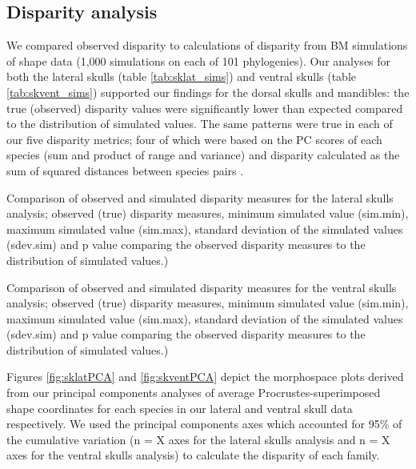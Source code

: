 \documentclass[12pt,a4paper]{article}
\begin{document}
\subsection{Disparity analysis}


We compared observed disparity to calculations of disparity from BM simulations of shape data (1,000 simulations on each of 101 phylogenies). Our analyses for both the lateral skulls (table \ref{tab:sklat_sims}) and ventral skulls (table \ref{tab:skvent_sims}) supported our findings for the dorsal skulls and mandibles: the true (observed) disparity values were significantly lower than expected compared to the distribution of simulated values. The same patterns were true in each of our five disparity metrics; four of which were based on the PC scores of each species (sum and product of range and variance) and disparity calculated as the sum of squared distances between species pairs \citep{Zelditch2012}. 

\begin{table}[H]				
\centering
\caption{Comparison of observed and simulated disparity measures for the lateral skulls analysis; observed (true) disparity measures, minimum simulated value (sim.min), maximum simulated value (sim.max), standard deviation of the simulated values (sdev.sim) and p value comparing the observed disparity measures to the distribution of simulated values.)}


\label{tab:sklat_sims} %
\end{table}

\begin{table}[H]				

\centering
\caption{Comparison of observed and simulated disparity measures for the ventral skulls analysis; observed (true) disparity measures, minimum simulated value (sim.min), maximum simulated value (sim.max), standard deviation of the simulated values (sdev.sim) and p value comparing the observed disparity measures to the distribution of simulated values.)}


\label{tab:skvent_sims} %
\end{table}


Figures  \ref{fig:sklatPCA} and \ref{fig:skventPCA} depict the morphospace plots derived from our principal components analyses of average Procrustes-superimposed shape coordinates for each species in our lateral and ventral skull data respectively. We used the principal components axes which accounted for 95\% of the cumulative variation (n = X axes for the lateral skulls analysis and n = X axes for the ventral skulls analysis) to calculate the disparity of each family. 
\end{document}
